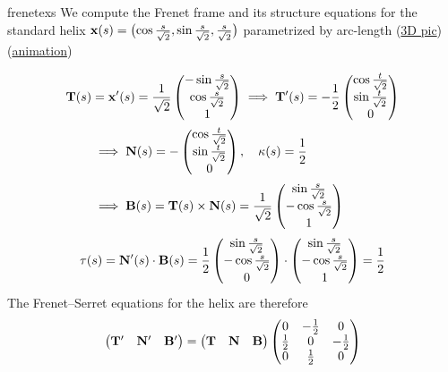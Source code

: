 \begin{examples}{}{frenetexs}
\exstart We compute the Frenet frame and its structure equations for the standard helix ${\mathbf{x}}(s)=\bigl(\cos\frac s{\sqrt 2},\sin\frac s{\sqrt 2},\frac s{\sqrt 2}\bigr)$ parametrized by arc-length (\href{http://www.math.uci.edu/~ndonalds/math162a/frenet-helixstill.html}{3D pic})(\href{http://www.math.uci.edu/~ndonalds/math162a/frenet-helixanim.html}{animation})\par
\begin{enumerate}\setcounter{enumi}{1}
\begin{minipage}[t]{0.71\linewidth}\vspace{-8pt}
\item[]\begin{gather*}
\begin{aligned}
{\mathbf{T}}(s)&={\mathbf{x}}'(s)=\frac 1{\sqrt 2}\begin{pmatrix}-\sin\frac s{\sqrt 2}\\\cos\frac s{\sqrt 2}\\1\end{pmatrix}\implies {\mathbf{T}}'(s)=-\frac 12\begin{pmatrix}\cos\frac t{\sqrt 2}\\\sin\frac t{\sqrt 2}\\0\end{pmatrix}\\
&\implies {\mathbf{N}}(s)=-\begin{pmatrix}\cos\frac t{\sqrt 2}\\\sin\frac t{\sqrt 2}\\0\end{pmatrix},\quad\kappa(s)=\frac 12\\
&\implies {\mathbf{B}}(s)={\mathbf{T}}(s)\times{\mathbf{N}}(s)=\frac 1{\sqrt 2}\begin{pmatrix}\sin\frac s{\sqrt 2}\\-\cos\frac s{\sqrt 2}\\1\end{pmatrix}
\end{aligned}\\
\tau(s)={\mathbf{N}}'(s)\cdot{\mathbf{B}}(s)=\frac 1{2}\begin{pmatrix}\sin\frac s{\sqrt 2}\\-\cos\frac s{\sqrt 2}\\0\end{pmatrix}\cdot\begin{pmatrix}\sin\frac s{\sqrt 2}\\-\cos\frac s{\sqrt 2}\\1\end{pmatrix}=\frac 12
\end{gather*}
The Frenet--Serret equations for the helix are therefore
\[\begin{pmatrix}
  {\mathbf{T}}'&{\mathbf{N}}'&{\mathbf{B}}'
  \end{pmatrix}=\begin{pmatrix}
  {\mathbf{T}}&{\mathbf{N}}&{\mathbf{B}}
  \end{pmatrix}\begin{pmatrix}
                    0&-\frac 12&0\\
                    \frac 12&0&-\frac 12\\
                    0&\frac 12&0
                    \end{pmatrix}\]
\end{minipage}\hfill\begin{minipage}[t]{0.28\linewidth}\vspace{-15pt}

\end{minipage}
\end{enumerate}
\end{examples}
